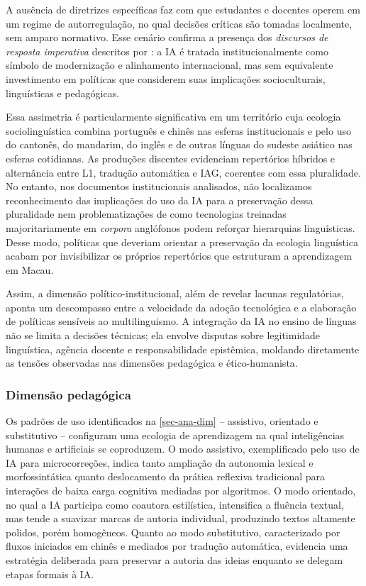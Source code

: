 \documentclass[portuguese]{textolivre}
\begin{document}
A ausência de diretrizes específicas faz com que estudantes e docentes operem em um regime de autorregulação, no qual decisões críticas são tomadas localmente, sem amparo normativo. Esse cenário confirma a presença dos \textit{discursos de resposta imperativa} descritos por \textcite{BearmanRyanAjjawi2023}: a IA é tratada institucionalmente como símbolo de modernização e alinhamento internacional, mas sem equivalente investimento em políticas que considerem suas implicações socioculturais, linguísticas e pedagógicas. 

Essa assimetria é particularmente significativa em um território cuja ecologia sociolinguística combina português e chinês nas esferas institucionais e pelo uso do cantonês, do mandarim, do inglês e de outras línguas do sudeste asiático nas esferas cotidianas. As produções discentes evidenciam repertórios híbridos e alternância entre L1, tradução automática e IAG, coerentes com essa pluralidade. No entanto, nos documentos institucionais analisados, não localizamos reconhecimento das implicações do uso da IA para a preservação dessa pluralidade nem problematizações de como tecnologias treinadas majoritariamente em \textit{corpora} anglófonos podem reforçar hierarquias linguísticas. Desse modo, políticas que deveriam orientar a preservação da ecologia linguística acabam por invisibilizar os próprios repertórios que estruturam a aprendizagem em Macau.

Assim, a dimensão político-institucional, além de revelar lacunas regulatórias, aponta um descompasso entre a velocidade da adoção tecnológica e a elaboração de políticas sensíveis ao multilinguismo. A integração da IA no ensino de línguas não se limita a decisões técnicas; ela envolve disputas sobre legitimidade linguística, agência docente e responsabilidade epistêmica, moldando diretamente as tensões observadas nas dimensões pedagógica e ético-humanista.


\subsubsection{Dimensão pedagógica}\label{sec-ana-ped}

Os padrões de uso identificados na \cref{sec-ana-dim} – assistivo, orientado e substitutivo – configuram uma ecologia de aprendizagem na qual inteligências humanas e artificiais se coproduzem. O modo assistivo, exemplificado pelo uso de IA para microcorreções, indica tanto ampliação da autonomia lexical e morfossintática quanto deslocamento da prática reflexiva tradicional para interações de baixa carga cognitiva mediadas por algoritmos. O modo orientado, no qual a IA participa como coautora estilística, intensifica a fluência textual, mas tende a suavizar marcas de autoria individual, produzindo textos altamente polidos, porém homogêneos. Quanto ao modo substitutivo, caracterizado por fluxos iniciados em chinês e mediados por tradução automática, evidencia uma estratégia deliberada para preservar a autoria das ideias enquanto se delegam etapas formais à IA.
\end{document}
